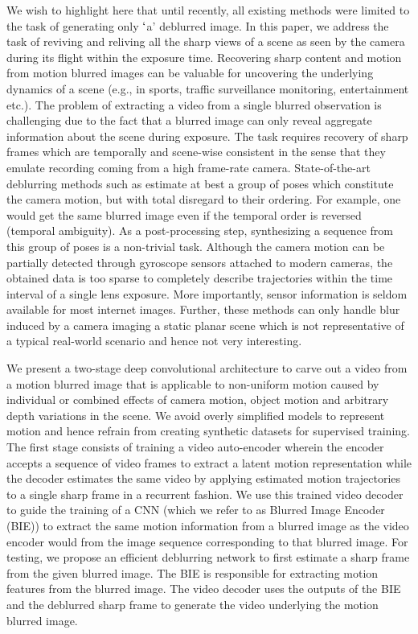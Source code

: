 \documentclass[10pt,twocolumn,letterpaper]{article}
\begin{document}
We wish to highlight here that until recently, all existing methods were limited to the task of generating only $\lq$a' deblurred image. In this paper, we address the task of reviving and reliving all the sharp views of a scene as seen by the camera during its flight within the exposure time. Recovering sharp content and motion from motion blurred images can be valuable for uncovering the underlying dynamics of a scene (e.g., in sports, traffic surveillance monitoring, entertainment etc.). The problem of extracting a video from a single blurred observation is challenging due to the fact that a blurred image can only reveal aggregate information about the scene during exposure. The task requires recovery of sharp frames which are temporally and scene-wise consistent in the sense that they emulate recording coming from a high frame-rate camera. State-of-the-art deblurring methods such as \cite{vasu2017local} \cite{pan2016blind} estimate at best a group of poses which constitute the camera motion, but with total disregard to their ordering. For example, one would get the same blurred image even if the temporal order is reversed (temporal ambiguity). As a post-processing step, synthesizing a sequence from this group of poses is a non-trivial task. Although the camera motion can be partially detected through gyroscope sensors attached to modern cameras, the obtained data is too sparse to completely describe trajectories within the time interval of a single lens exposure. More importantly, sensor information is seldom available for most internet images. Further, these methods can only handle blur induced by a camera imaging a static planar scene which is not representative of a typical real-world scenario and hence not very interesting. 


We present a two-stage deep convolutional architecture to carve out a video from a motion blurred image that is applicable to non-uniform motion caused by individual or combined effects of camera motion, object motion and arbitrary depth variations in the scene. We avoid overly simplified models to represent motion and hence refrain from creating synthetic datasets for supervised training. The first stage consists of training a video auto-encoder wherein the encoder accepts a sequence of video frames to extract a latent motion representation while the decoder estimates the same video by applying estimated motion trajectories to a single sharp frame in a recurrent fashion. We use this trained video decoder to guide the training of a CNN (which we refer to as Blurred Image Encoder (BIE)) to extract the same motion information from a blurred image as the video encoder would from the image sequence corresponding to that blurred image. For testing, we propose an efficient deblurring network to first estimate a sharp frame from the given blurred image. The BIE is responsible for extracting motion features from the blurred image. The video decoder uses the outputs of the BIE and the deblurred sharp frame to generate the video underlying the motion blurred image.
\end{document}
